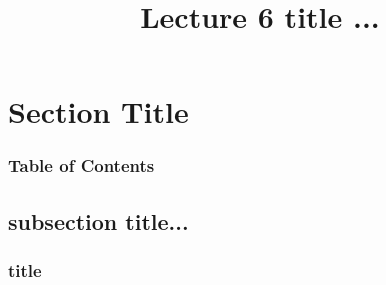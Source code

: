 \documentclass[xcolor=dvipsnames]{beamer}
\begin{document}
	\title[Lecture 6]{Lecture 6 title ...}
	\author[]{\className}
	\institute[\className]{\departmentName}
	\date{} 


	\begin{frame}
		\maketitle
	\end{frame}


\section{Section Title} 

	\begin{frame} \frametitle{Table of Contents}
		\tableofcontents[currentsection]
	\end{frame} 
	
	
	\subsection{subsection title...}
	
		\begin{frame} \frametitle{title}
	
		\end{frame}
\end{document}
